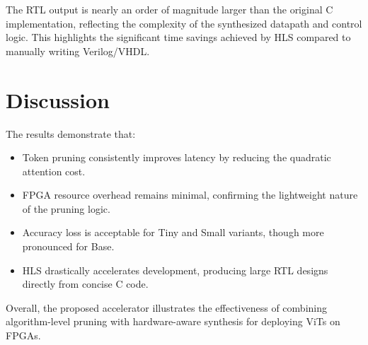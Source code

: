 
The RTL output is nearly an order of magnitude larger than the original C implementation, reflecting the complexity of the synthesized datapath and control logic. This highlights the significant time savings achieved by HLS compared to manually writing Verilog/VHDL.


\section{Discussion}

The results demonstrate that:
\begin{itemize}
    \item Token pruning consistently improves latency by reducing the quadratic attention cost.
    \item FPGA resource overhead remains minimal, confirming the lightweight nature of the pruning logic.
    \item Accuracy loss is acceptable for Tiny and Small variants, though more pronounced for Base.
    \item HLS drastically accelerates development, producing large RTL designs directly from concise C code.
\end{itemize}

Overall, the proposed accelerator illustrates the effectiveness of combining algorithm-level pruning with hardware-aware synthesis for deploying ViTs on FPGAs.
